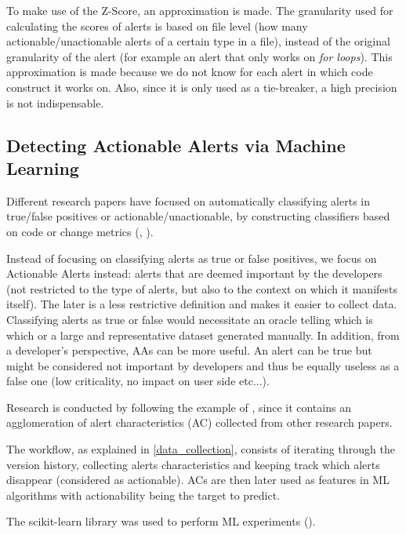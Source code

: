 To make use of the Z-Score, an approximation is made. The granularity used for calculating the scores of alerts is based on file level (how many actionable/unactionable alerts of a certain type in a file), instead of the original granularity of the alert (for example an alert that only works on \textit{for loops}). This approximation is made because we do not know for each alert in which code construct it works on. Also, since it is only used as a tie-breaker, a high precision is not indispensable.

\subsection{Detecting Actionable Alerts via Machine Learning}

Different research papers have focused on automatically classifying alerts in true/false positives or actionable/unactionable, by constructing classifiers based on code or change metrics (\cite{actionable_sa}, \cite{model_building_actionable}).

Instead of focusing on classifying alerts as true or false positives, we focus on Actionable Alerts instead: alerts that are deemed important by the developers (not restricted to the type of alerts, but also to the context on which it manifests itself). The later is a less restrictive definition and makes it easier to collect data. Classifying alerts as true or false would necessitate an oracle telling which is which or a large and representative dataset generated manually. In addition, from a developer's perspective, AAs can be more useful. An alert can be true but might be considered not important by developers and thus be equally useless as a false one (low criticality, no impact on user side etc...).

Research is conducted by following the example of \cite{model_building_actionable}, since it contains an agglomeration of alert characteristics (AC) collected from other research papers.

The workflow, as explained in \cref{data_collection}, consists of iterating through the version history, collecting alerts characteristics and keeping track which alerts disappear (considered as actionable). ACs are then later used as features in ML algorithms with actionability being the target to predict.

The scikit-learn library was used to perform ML experiments (\cite{scikit-learn}).

